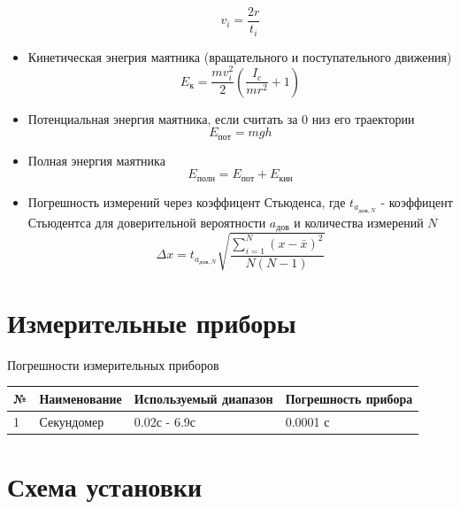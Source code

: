 \documentclass[a4paper]{article}
\begin{document}
\begin{itemize}
    \begin{equation}
        v_i = \frac{2r}{t_i}
        \label{v}
    \end{equation}
    \item Кинетическая энегрия маятника (вращательного и поступательного движения)
    \begin{equation}
        E_к =\frac{m v^2_i}{2}(\frac{I_c}{m r^2} + 1)
        \label{Ek}
    \end{equation}
    \item Потенциальная энергия маятника, если считать за 0 низ его траектории
    \begin{equation}
        E_{пот}=m g h
        \label{Ep}
    \end{equation}
    \item Полная энергия маятника
    \begin{equation}
        E_{полн} = E_{пот} + E_{кин}
        \label{Efull}
    \end{equation}
    \item Погрешность измерений через коэффицент Стьюденса, где $t_{a_{дов, N}}$ - коэффицент Стьюдентса для доверительной вероятности $a_{дов}$ и количества измерений $N$ 
    \begin{equation}
        \Delta x = t_{a_{дов, N}}\sqrt{\frac{\sum\limits_{i=1}^N (x - \bar{x})^2}{N (N-1)}}
        \label{studentskof}
    \end{equation}
\end{itemize}

\section{Измерительные приборы}
$\textbf{Погрешности измерительных приборов}$

\begin{tabular}{ l | l | l | l }\hline
№ & Наименование & Используемый диапазон & Погрешность прибора \\ \hline
1 &	Секундомер & 0.02с - 6.9с & 	0.0001 с \\   \hline
\end{tabular}

\section{Схема установки}
\end{document}
